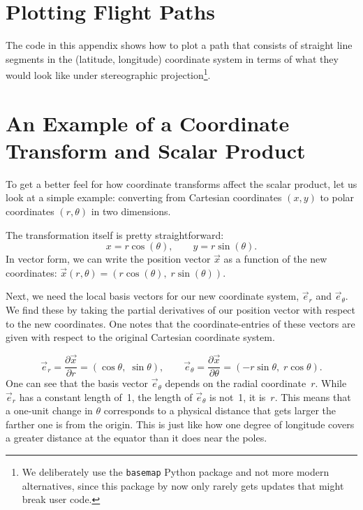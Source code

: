 \documentclass[twocolumn]{article}
\begin{document}



\appendix

\onecolumn

\section{Plotting Flight Paths}\label{app:plotflightpaths}

The code in this appendix shows how to plot a path that consists of
straight line segments in the (latitude, longitude) coordinate system
in terms of what they would look like under stereographic
projection\footnote{We deliberately use the \texttt{basemap} Python
package and not more modern alternatives, since this package by now
only rarely gets updates that might break user code.}.



\twocolumn

\section{An Example of a Coordinate Transform and Scalar Product}\label{app:polar}

To get a better feel for how coordinate transforms affect the scalar
product, let us look at a simple example: converting from Cartesian
coordinates $(x, y)$ to polar coordinates $(r, \theta)$ in two
dimensions.

The transformation itself is pretty straightforward:
\begin{equation}
  x = r \cos(\theta), \qquad y = r \sin(\theta).
\end{equation}
In vector form, we can write the position vector $\vec{x}$ as a function
of the new coordinates:
$\vec{x}(r, \theta) = (r \cos(\theta),\; r \sin(\theta))$.

Next, we need the local basis vectors for our new coordinate system,
$\vec{e}_r$ and $\vec{e}_\theta$. We find these by taking the partial
derivatives of our position vector with respect to the new
coordinates. One notes that the coordinate-entries of these vectors
are given with respect to the original Cartesian coordinate system.

\begin{equation}
  \vec{e}_r
    = \frac{\partial \vec{x}}{\partial r}
    = (\cos\theta,\; \sin\theta),
  \qquad
  \vec{e}_\theta
    = \frac{\partial \vec{x}}{\partial \theta}
    = (-r\sin\theta,\; r\cos\theta).
\end{equation}
One can see that the basis vector $\vec{e}_\theta$ depends on the radial
coordinate~$r$. While $\vec{e}_r$ has a constant length of~1, the
length of $\vec{e}_\theta$ is not~1, it is~$r$.  This means that a
one-unit change in $\theta$ corresponds to a physical distance that gets
larger the farther one is from the origin. This is just like how one
degree of longitude covers a greater distance at the equator than it
does near the poles.
\end{document}
